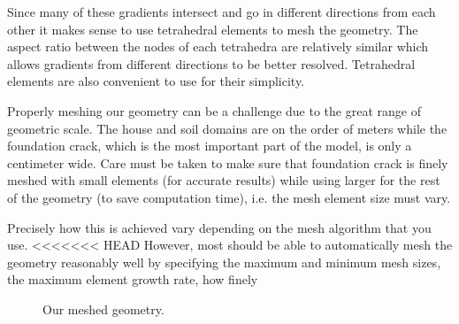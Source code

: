 Since many of these gradients intersect and go in different directions from each other it makes sense to use tetrahedral elements to mesh the geometry.
The aspect ratio between the nodes of each tetrahedra are relatively similar which allows gradients from different directions to be better resolved.
Tetrahedral elements are also convenient to use for their simplicity.\par

Properly meshing our geometry can be a challenge due to the great range of geometric scale.
The house and soil domains are on the order of meters while the foundation crack, which is the most important part of the model, is only a centimeter wide.
Care must be taken to make sure that foundation crack is finely meshed with small elements (for accurate results) while using larger for the rest of the geometry (to save computation time), i.e. the mesh element size must vary.\par

Precisely how this is achieved vary depending on the mesh algorithm that you use.
<<<<<<< HEAD
However, most should be able to automatically mesh the geometry reasonably well by specifying the maximum and minimum mesh sizes, the maximum element growth rate, how finely

\begin{figure}[htb!]
  \caption{Our meshed geometry.}
  \label{fig:meshed_geometry}
\end{figure}
